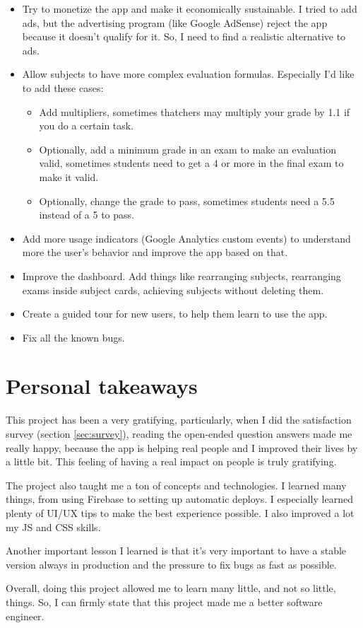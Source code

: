 \begin{itemize}
    \item Try to monetize the app and make it economically sustainable. I tried to add ads, but the advertising program (like Google AdSense) reject the app because it doesn't qualify for it. So, I need to find a realistic alternative to ads.
    \item Allow subjects to have more complex evaluation formulas. Especially I'd like to add these cases:
    \begin{itemize}[noitemsep]
        \item Add multipliers, sometimes thatchers may multiply your grade by 1.1 if you do a certain task.
        \item Optionally, add a minimum grade in an exam to make an evaluation valid, sometimes students need to get a 4 or more in the final exam to make it valid.
        \item Optionally, change the grade to pass, sometimes students need a 5.5 instead of a 5 to pass.
    \end{itemize}
    \item Add more usage indicators (Google Analytics custom events) to understand more the user's behavior and improve the app based on that.
    \item Improve the dashboard. Add things like rearranging subjects, rearranging exams inside subject cards, achieving subjects without deleting them.
    \item Create a guided tour for new users, to help them learn to use the app.
    \item Fix all the known bugs.
\end{itemize}

\clearpage\newpage
\section{Personal takeaways}

This project has been a very gratifying, particularly, when I did the satisfaction survey (section \ref{sec:survey}), reading the open-ended question answers made me really happy, because the app is helping real people and I improved their lives by a little bit. This feeling of having a real impact on people is truly gratifying.

The project also taught me a ton of concepts and technologies. I learned many things, from using Firebase to setting up automatic deploys. I especially learned plenty of UI/UX tips to make the best experience possible. I also improved a lot my JS and CSS skills.

Another important lesson I learned is that it's very important to have a stable version always in production and the pressure to fix bugs as fast as possible.

Overall, doing this project allowed me to learn many little, and not so little, things. So, I can firmly state that this project made me a better software engineer.

